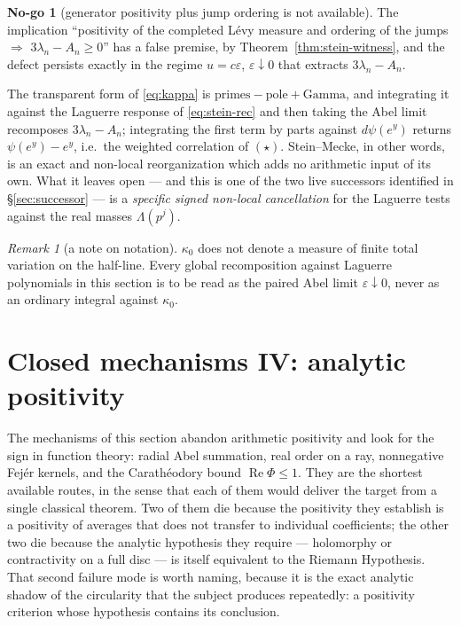 \documentclass[11pt]{amsart}
\theoremstyle{definition}
\theoremstyle{remark}
\newtheorem{remark}[theorem]{Remark}
\theoremstyle{definition}
\newtheorem{nogo}{No-go}[section]
\renewcommand{\Re}{\operatorname{Re}}
\newcommand{\eps}{\varepsilon}
\begin{document}
\begin{nogo}[generator positivity plus jump ordering is not available]\label{ng:stein}
The implication ``positivity of the completed L\'evy measure and ordering of the jumps
$\Rightarrow$ $3\lambda_n-A_n\ge0$'' has a false premise, by Theorem~\ref{thm:stein-witness}, and the defect
persists exactly in the regime $u=c\eps$, $\eps\downarrow0$ that extracts
$3\lambda_n-A_n$.
\end{nogo}

\noindent The transparent form of \eqref{eq:kappa} is
$\text{primes}-\text{pole}+\text{Gamma}$, and integrating it against the Laguerre response of
\eqref{eq:stein-rec} and then taking the Abel limit recomposes $3\lambda_n-A_n$; integrating the
first term by parts against $d\psi(e^y)$ returns $\psi(e^y)-e^y$, i.e.\ the weighted correlation
of $(\star)$. Stein--Mecke, in other words, is an exact and non-local reorganization which
adds no arithmetic input of its own. What it leaves open --- and this is one of the two live
successors identified in \S\ref{sec:successor} --- is a \emph{specific signed non-local
cancellation} for the Laguerre tests against the real masses $\Lambda(p^j)$.

\begin{remark}[a note on notation]\label{rmk:kappa-scope}
$\kappa_0$ does not denote a measure of finite total variation on the half-line. Every global
recomposition against Laguerre polynomials in this section is to be read as the paired Abel limit
$\eps\downarrow0$, never as an ordinary integral against $\kappa_0$.
\end{remark}

\section{Closed mechanisms IV: analytic positivity}\label{sec:mech-analytic}

The mechanisms of this section abandon arithmetic positivity and look for the sign in function
theory: radial Abel summation, real order on a ray, nonnegative Fej\'er kernels, and the
Carath\'eodory bound $\Re\Phi\le1$. They are the shortest available routes, in the sense that
each of them would deliver the target from a single classical theorem. Two of them die because
the positivity they establish is a positivity of averages that does not transfer to individual
coefficients; the other two die because the analytic hypothesis they require --- holomorphy or
contractivity on a full disc --- is itself equivalent to the Riemann Hypothesis. That second
failure mode is worth naming, because it is the exact analytic shadow of the circularity that the
subject produces repeatedly: a positivity criterion whose hypothesis contains its conclusion.
\end{document}
